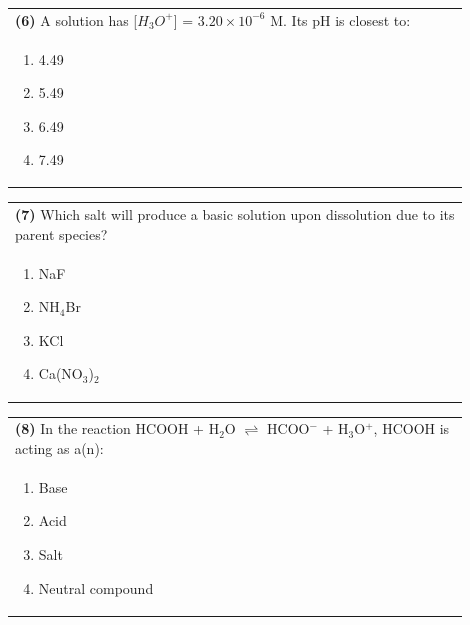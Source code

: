 \documentclass{article}
\begin{document}
\noindent\begin{tabular}{|p{0.9\linewidth}|}
\hline
\textbf{(6)} A solution has [$H_3O^+$] = $3.20\times10^{-6}$ M. Its pH is closest to: \\[0.2cm]
\begin{minipage}{0.85\linewidth}
\begin{enumerate}[label=\alph*.]
\item 4.49 \item 5.49 \item 6.49 \item 7.49
\end{enumerate}
\end{minipage}\\[0.2cm]
\hline
\end{tabular}

\noindent\begin{tabular}{|p{0.9\linewidth}|}
\hline
\textbf{(7)} Which salt will produce a basic solution upon dissolution due to its parent species? \\[0.2cm]
\begin{minipage}{0.85\linewidth}
\begin{enumerate}[label=\alph*.]
\item NaF \item NH$_4$Br \item KCl \item Ca(NO$_3$)$_2$
\end{enumerate}
\end{minipage}\\[0.2cm]
\hline
\end{tabular}

\noindent\begin{tabular}{|p{0.9\linewidth}|}
\hline
\textbf{(8)} In the reaction HCOOH + H$_2$O $\rightleftharpoons$ HCOO$^-$ + H$_3$O$^+$, HCOOH is acting as a(n): \\[0.2cm]
\begin{minipage}{0.85\linewidth}
\begin{enumerate}[label=\alph*.]
\item Base \item Acid \item Salt \item Neutral compound
\end{enumerate}
\end{minipage}\\[0.2cm]
\hline
\end{tabular}
\newpage
\end{document}
